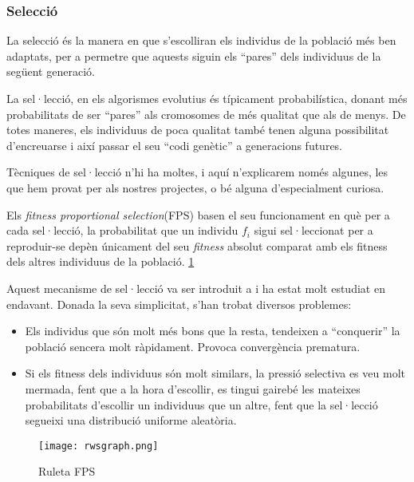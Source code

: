 \documentclass[titlepage,a4paper,12pt]{book}
\begin{document}
\subsubsection{Selecció}
La selecció és la manera en que s'escolliran els individus de la població més
ben adaptats, per a permetre que aquests siguin els ``pares'' dels individuus de
la següent generació.

La sel·lecció, en els algorismes evolutius és típicament probabilística, donant
més probabilitats de ser ``pares'' als cromosomes de més qualitat que als de
menys.  De totes maneres, els individuus de poca qualitat també tenen alguna
possibilitat d'encreuarse i així passar el seu ``codi genètic'' a generacions
futures.

Tècniques de sel·lecció n'hi ha moltes, i aquí n'explicarem només algunes, les
que hem provat per als nostres projectes, o bé alguna d'especialment curiosa.

Els \emph{fitness proportional selection}(FPS) basen el seu funcionament en què
per a cada sel·lecció, la probabilitat que un individu $f_i$ sigui sel·leccionat
per a reproduir-se depèn únicament del seu \emph{fitness} absolut comparat amb
els fitness dels altres individuus de la població. \ref{fig:rwsgraph} 

Aquest mecanisme de sel·lecció va ser introduit a \cite{H75} i ha estat molt
estudiat en endavant.  Donada la seva simplicitat, s'han trobat diversos
problemes:

\begin{itemize}
	\item Els individus que són molt més bons que la resta, tendeixen a
	``conquerir'' la població sencera molt ràpidament. Provoca convergència
	prematura.
	\item Si els fitness dels individuus són molt similars, la pressió selectiva
	es veu molt mermada, fent que a la hora d'escollir, es tingui gairebé les
	mateixes probabilitats d'escollir un individuus que un altre, fent que la
	sel·lecció segueixi una distribució uniforme aleatòria.
\end{itemize}


\begin{figure} \centering \texttt{[image: rwsgraph.png]}
\caption{\label{fig:rwsgraph}Ruleta FPS}
\end{figure}
\end{document}
